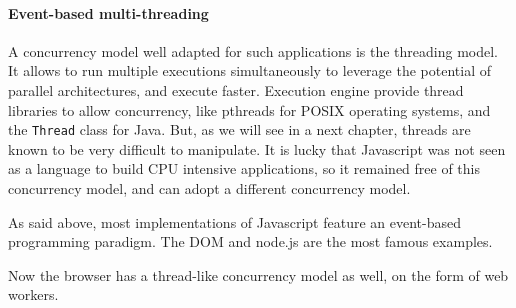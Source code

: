 \paragraph{Event-based multi-threading}
















A concurrency model well adapted for such applications is the threading model.
It allows to run multiple executions simultaneously to leverage the potential of parallel architectures, and execute faster.
Execution engine provide thread libraries to allow concurrency, like pthreads for POSIX operating systems, and the \texttt{Thread} class for Java.
But, as we will see in a next chapter, threads are known to be very difficult to manipulate.
It is lucky that Javascript was not seen as a language to build CPU intensive applications, so it remained free of this concurrency model, and can adopt a different concurrency model.



















As said above, most implementations of Javascript feature an event-based programming paradigm.
The DOM and node.js are the most famous examples.

Now the browser has a thread-like concurrency model as well, on the form of web workers.

